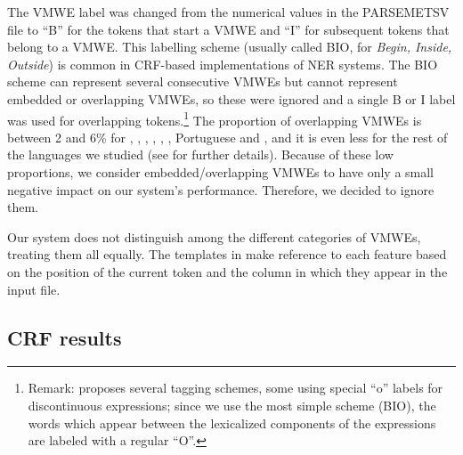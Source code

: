 \documentclass[output=paper,modfonts,nonflat]{langsci/langscibook}
\begin{document}
The VMWE label was changed from the
numerical values in the PARSEMETSV file to ``B'' for the tokens that
start a VMWE and ``I'' for subsequent tokens that belong to a
VMWE. This labelling scheme (usually called BIO, for {\em Begin,
Inside, Outside}) is common in CRF-based implementations of
NER systems. The BIO scheme can represent several
consecutive VMWEs but cannot represent embedded or overlapping VMWEs, so
these were ignored and a single B or I label was used for overlapping
tokens.\footnote{Remark: \cite{Schneider14b} proposes several tagging schemes, some using special ``o'' labels for discontinuous expressions; since we use the most simple scheme (BIO), the words which appear between the lexicalized components of the expressions are labeled with a regular ``O''.} %
The proportion of overlapping VMWEs is between 2 and 6\% for , , , , , , Portuguese and ,
and it is even less for the rest of the languages we studied (see  for further details).
Because of these low proportions, we consider embedded/overlapping VMWEs to have only a small negative impact on our system's performance. Therefore, we decided to ignore them.

Our system does not distinguish among the different categories of VMWEs, treating them all equally. The templates in
 make reference to each feature based on
the position of the current token and the column in which they appear
in the input file.

\subsection{CRF results}

\end{document}
